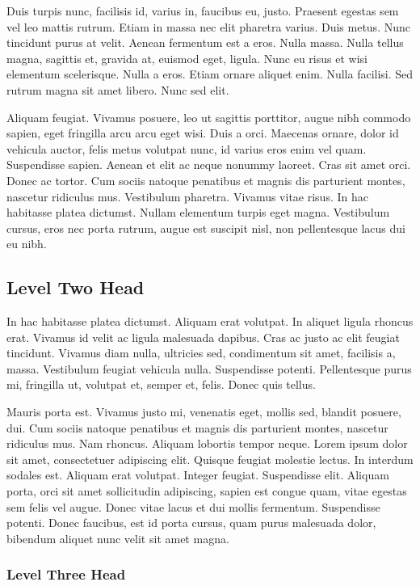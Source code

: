 Duis turpis nunc, facilisis id, varius in, faucibus eu, justo.
Praesent egestas sem vel leo mattis rutrum. Etiam in massa nec
elit pharetra varius. Duis metus. Nunc tincidunt purus at velit.
Aenean fermentum est a eros. Nulla massa. Nulla tellus magna,
sagittis et, gravida at, euismod eget, ligula. Nunc eu risus et
wisi elementum scelerisque. Nulla a eros. Etiam ornare aliquet
enim. Nulla facilisi. Sed rutrum magna sit amet libero. Nunc sed
elit.

Aliquam feugiat. Vivamus posuere, leo ut sagittis porttitor,
augue nibh commodo sapien, eget fringilla arcu arcu eget wisi.
Duis a orci. Maecenas ornare, dolor id vehicula auctor, felis
metus volutpat nunc, id varius eros enim vel quam. Suspendisse
sapien. Aenean et elit ac neque nonummy laoreet. Cras sit amet
orci. Donec ac tortor. Cum sociis natoque penatibus et magnis dis
parturient montes, nascetur ridiculus mus. Vestibulum pharetra.
Vivamus vitae risus. In hac habitasse platea dictumst. Nullam
elementum turpis eget magna. Vestibulum cursus, eros nec porta
rutrum, augue est suscipit nisl, non pellentesque lacus dui eu
nibh.

\subsection{Level Two Head}

In hac habitasse platea dictumst. Aliquam erat volutpat. In
aliquet ligula rhoncus erat. Vivamus id velit ac ligula malesuada
dapibus. Cras ac justo ac elit feugiat tincidunt. Vivamus diam
nulla, ultricies sed, condimentum sit amet, facilisis a, massa.
Vestibulum feugiat vehicula nulla. Suspendisse potenti.
Pellentesque purus mi, fringilla ut, volutpat et, semper et,
felis. Donec quis tellus.

Mauris porta est. Vivamus justo mi, venenatis eget, mollis sed,
blandit posuere, dui. Cum sociis natoque penatibus et magnis dis
parturient montes, nascetur ridiculus mus. Nam rhoncus. Aliquam
lobortis tempor neque. Lorem ipsum dolor sit amet, consectetuer
adipiscing elit. Quisque feugiat molestie lectus. In interdum
sodales est. Aliquam erat volutpat. Integer feugiat. Suspendisse
elit. Aliquam porta, orci sit amet sollicitudin adipiscing,
sapien est congue quam, vitae egestas sem felis vel augue. Donec
vitae lacus et dui mollis fermentum. Suspendisse potenti. Donec
faucibus, est id porta cursus, quam purus malesuada dolor,
bibendum aliquet nunc velit sit amet magna.

\subsubsection{Level Three Head}

